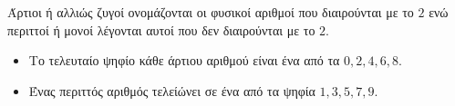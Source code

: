 Άρτιοι ή αλλιώς ζυγοί ονομάζονται οι φυσικοί αριθμοί που διαιρούνται με το $ 2 $ ενώ περιττοί ή μονοί λέγονται αυτοί που δεν διαιρούνται με το $ 2 $. 
\begin{itemize}
\item Το τελευταίο ψηφίο κάθε άρτιου αριθμού είναι ένα από τα $ 0,2,4,6,8 $. 
\item Ένας περιττός αριθμός τελείώνει σε ένα από τα ψηφία $ 1,3,5,7,9 $.
\end{itemize}
